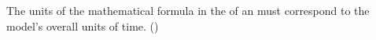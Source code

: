 The units of the mathematical formula in the \Delay of an \Event must
correspond to the model's overall units of time.  ()
